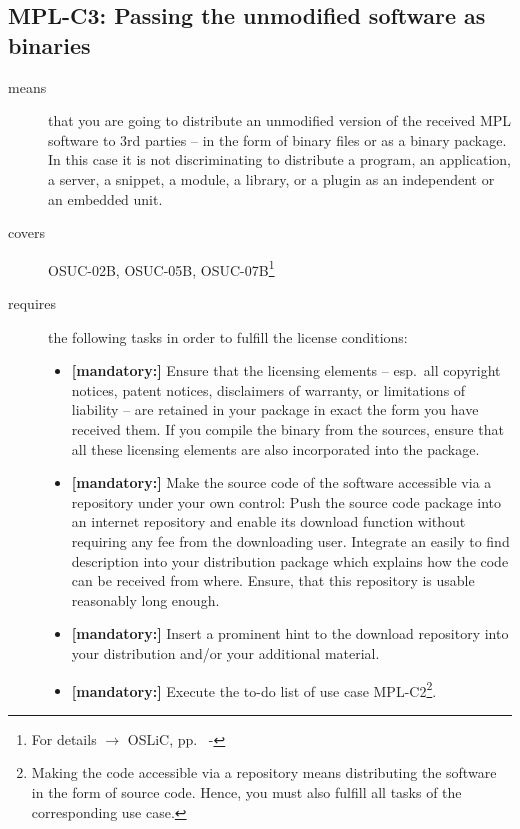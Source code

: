 \subsection{MPL-C3: Passing the unmodified software as binaries} 
\label{OSUC-02B-MPL} \label{OSUC-05B-MPL} \label{OSUC-07B-MPL}

\begin{description}
\item[means] that you are going to distribute an unmodified version of the
received MPL software to 3rd parties -- in the form of binary files or as a
bi\-na\-ry package. In this case it is not discriminating to distribute a
program, an application, a server, a snippet, a module, a library, or a plugin
as an independent or an embedded unit.

\item[covers] OSUC-02B, OSUC-05B, OSUC-07B\footnote{For details $\rightarrow$
OSLiC, pp.\ \pageref{OSUC-02B-DEF} - \pageref{OSUC-07B-DEF}}

\item[requires] the following tasks in order to fulfill the license conditions:
\begin{itemize}
  
  \item \textbf{[mandatory:]} Ensure that the licensing elements -- esp.\ all
  copyright notices, patent notices, disclaimers of warranty, or limitations of
  liability -- are retained in your package in exact the form you have received
  them. If you compile the binary from the sources, ensure that all these
  licensing elements are also incorporated into the package.
  
  \item \textbf{[mandatory:]} Make the source code of the software accessible
  via a repository under your own control: Push the source code package into an
  internet repository and enable its download function without requiring any fee
  from the downloading user. Integrate an easily to find description into your
  distribution package which explains how the code can be received from where.
  Ensure, that this repository is usable reasonably long enough.
  
  \item \textbf{[mandatory:]} Insert a prominent hint to the download repository
  into your distribution and/or your additional material.
  
  \item \textbf{[mandatory:]} Execute the to-do list of use case MPL-C2\footnote{
  Making the code accessible via a repository means distributing the software in
  the form of source code. Hence, you must also fulfill all tasks of the
  corresponding use case.}.
  

\end{itemize}
\end{description}
